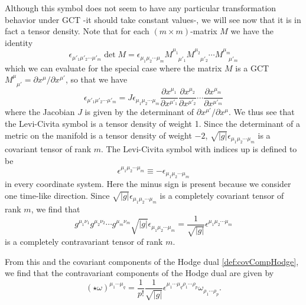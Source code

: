 \documentclass[12pt,twoside]{book}
\begin{document}
\begin{appendices}
Although this symbol does not seem to have any particular transformation behavior under GCT -it should take constant values-, we will see now that it is in fact a tensor density. Note that for each $(m \times m)$-matrix $M$ we have the identity
\begin{equation}
\epsilon_{\mu'_{1}\mu'_{2}\cdots\mu'_{m}} \det M =
\epsilon_{\mu_{1}\mu_{2}\cdots\mu_{m}} M^{\mu_{1}}_{\quad \mu'_{1}}M^{\mu_{2}}_{\quad \mu'_{2}}\cdots M^{\mu_{m}}_{\quad \mu'_{m}}
\end{equation}
which we can evaluate for the special case where the matrix $M$ is a GCT $M^{\mu}_{\:\:\: \mu'} = \partial x^{\mu} / \partial x^{\mu'}$, so that we have
\begin{equation}
\epsilon_{\mu'_{1}\mu'_{2}\cdots\mu'_{m}} = J \epsilon_{\mu_{1}\mu_{2}\cdots\mu_{m}}
\frac{\partial x^{\mu_{1}}}{\partial x^{\mu'_{1}}} \frac{\partial x^{\mu_{2}}}{\partial x^{\mu'_{2}}}\cdots\frac{\partial x^{\mu_{m}}}{\partial x^{\mu'_{m}}}
\end{equation}
where the Jacobian $J$ is given by the determinant of $\partial x^{\mu'} / \partial x^{\mu}$. We thus see that the Levi-Civita symbol is a tensor density of weight 1. Since the determinant of a metric on the manifold is a tensor density of weight $-2$, $\sqrt{|g|}\epsilon_{\mu_{1}\mu_{2}\cdots\mu_{m}}$ is a covariant tensor of rank $m$. The Levi-Civita symbol with indices up is defined to be
\begin{equation}
\epsilon^{\mu_{1}\mu_{2}\cdots\mu_{m}} \equiv - \epsilon_{\mu_{1}\mu_{2}\cdots\mu_{m}}
\end{equation}
in every coordinate system. Here the minus sign is present because we consider one time-like direction. Since $\sqrt{|g|}\epsilon_{\mu_{1}\mu_{2}\cdots\mu_{m}}$ is a completely covariant tensor of rank $m$, we find that
\begin{equation}
g^{\mu_{1}\nu_{1}}g^{\mu_{2}\nu_{2}}\cdots g^{\mu_{m}\nu_{m}}\sqrt{|g|}\epsilon_{\mu_{1}\mu_{2}\cdots\mu_{m}}
=\frac{1}{\sqrt{|g|}}\epsilon^{\mu_{1}\mu_{2}\cdots\mu_{m}}
\end{equation}
is a completely contravariant tensor of rank $m$.\newline

From this and the covariant components of the Hodge dual \eqref{def:covCompHodge}, we find that the contravariant components of the Hodge dual are given by
\begin{equation}
(\star \omega)^{\mu_{1} \cdots \mu_{q}} = \frac{1}{p!} \frac{1}{\sqrt{|g|}} \epsilon^{\mu_{1} \cdots \mu_{q} \rho_{1} \cdots \rho_{p}} \omega_{\rho_{1} \cdots \rho_{p}}.
\end{equation}



\end{appendices}
\end{document}
